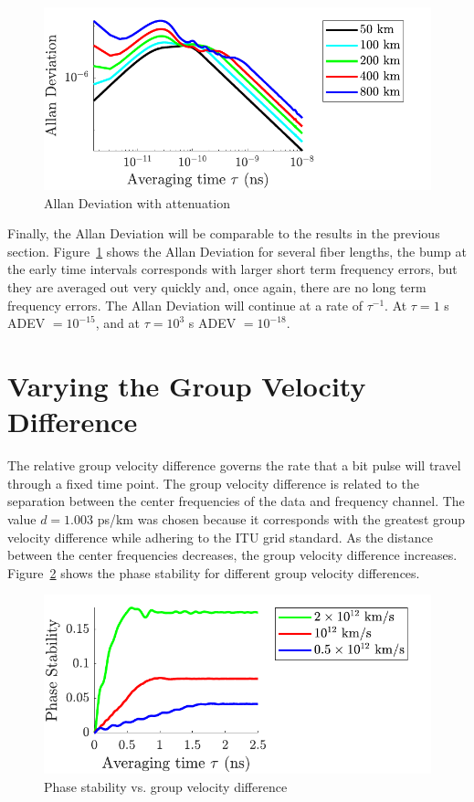 %
\begin{figure}[htb]
	\centering
	\includegraphics{img/AAllanDev}
	\caption{Allan Deviation with attenuation} \label{fig:AAllanDev}
\end{figure}
%
Finally, the Allan Deviation will be comparable to the results in the previous section. Figure~\ref{fig:AAllanDev} shows the Allan Deviation for several fiber lengths, the bump at the early time intervals corresponds with larger short term frequency errors, but they are averaged out very quickly and, once again, there are no long term frequency errors. The Allan Deviation will continue at a rate of $\tau^{-1}$. At $\tau=1$ s ADEV $=10^{-15}$, and at $\tau=10^3$ s ADEV $=10^{-18}$.


\section{Varying the Group Velocity Difference}

The relative group velocity difference governs the rate that a bit pulse will travel through a fixed time point. The group velocity difference is related to the separation between the center frequencies of the data and frequency channel. The value $d = 1.003$ ps/km was chosen because it corresponds with the greatest group velocity difference while adhering to the ITU grid standard. As the distance between the center frequencies decreases, the group velocity difference increases. Figure~\ref{fig:GVPhaseStability} shows the phase stability for different group velocity differences. 
%
\begin{figure}[htb]
	\centering
	\includegraphics{img/GVPhaseStability}
	\caption{Phase stability vs. group velocity difference} \label{fig:GVPhaseStability}
\end{figure}
%



